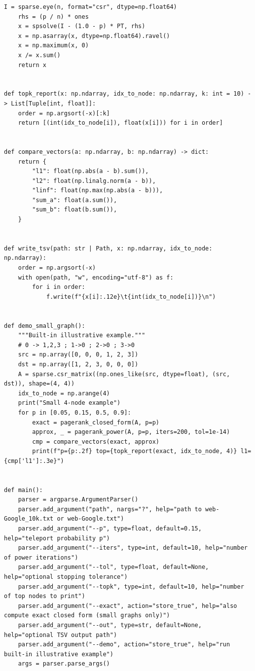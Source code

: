 \documentclass[12pt]{article}
\begin{document}
\begin{lstlisting}[style=pythonstyle]
    I = sparse.eye(n, format="csr", dtype=np.float64)
    rhs = (p / n) * ones
    x = spsolve(I - (1.0 - p) * PT, rhs)
    x = np.asarray(x, dtype=np.float64).ravel()
    x = np.maximum(x, 0)
    x /= x.sum()
    return x


def topk_report(x: np.ndarray, idx_to_node: np.ndarray, k: int = 10) -> List[Tuple[int, float]]:
    order = np.argsort(-x)[:k]
    return [(int(idx_to_node[i]), float(x[i])) for i in order]


def compare_vectors(a: np.ndarray, b: np.ndarray) -> dict:
    return {
        "l1": float(np.abs(a - b).sum()),
        "l2": float(np.linalg.norm(a - b)),
        "linf": float(np.max(np.abs(a - b))),
        "sum_a": float(a.sum()),
        "sum_b": float(b.sum()),
    }


def write_tsv(path: str | Path, x: np.ndarray, idx_to_node: np.ndarray):
    order = np.argsort(-x)
    with open(path, "w", encoding="utf-8") as f:
        for i in order:
            f.write(f"{x[i]:.12e}\t{int(idx_to_node[i])}\n")


def demo_small_graph():
    """Built-in illustrative example."""
    # 0 -> 1,2,3 ; 1->0 ; 2->0 ; 3->0
    src = np.array([0, 0, 0, 1, 2, 3])
    dst = np.array([1, 2, 3, 0, 0, 0])
    A = sparse.csr_matrix((np.ones_like(src, dtype=float), (src, dst)), shape=(4, 4))
    idx_to_node = np.arange(4)
    print("Small 4-node example")
    for p in [0.05, 0.15, 0.5, 0.9]:
        exact = pagerank_closed_form(A, p=p)
        approx, _ = pagerank_power(A, p=p, iters=200, tol=1e-14)
        cmp = compare_vectors(exact, approx)
        print(f"p={p:.2f} top={topk_report(exact, idx_to_node, 4)} l1={cmp['l1']:.3e}")


def main():
    parser = argparse.ArgumentParser()
    parser.add_argument("path", nargs="?", help="path to web-Google_10k.txt or web-Google.txt")
    parser.add_argument("--p", type=float, default=0.15, help="teleport probability p")
    parser.add_argument("--iters", type=int, default=10, help="number of power iterations")
    parser.add_argument("--tol", type=float, default=None, help="optional stopping tolerance")
    parser.add_argument("--topk", type=int, default=10, help="number of top nodes to print")
    parser.add_argument("--exact", action="store_true", help="also compute exact closed form (small graphs only)")
    parser.add_argument("--out", type=str, default=None, help="optional TSV output path")
    parser.add_argument("--demo", action="store_true", help="run built-in illustrative example")
    args = parser.parse_args()


\end{lstlisting}
\end{document}
